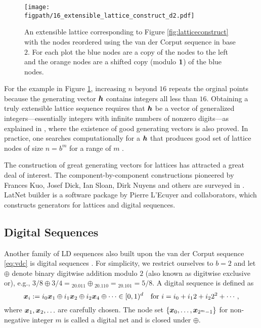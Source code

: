 \documentclass{svproc}
\newcommand{\figpath}{Figures}
\begin{document}
\begin{figure}
	\centering
	\texttt{[image: \\figpath/16\_extensible\_lattice\_construct\_d2.pdf]}
	\caption{An extensible lattice corresponding to  Figure \ref{fig:latticeconstruct}  with the nodes reordered using the van der Corput sequence in base $2$.  For each plot the blue nodes are a copy of the nodes to the left and the orange nodes are a shifted copy (modulo ${\boldsymbol{1}}$) of the blue nodes. \label{fig:extensiblelatticeconstruct}}
\end{figure}

For the example in Figure \ref{fig:extensiblelatticeconstruct}, increasing $n$ beyond $16$ repeats the orginal points because the generating vector ${\boldsymbol{h}}$ contains integers all less than $16$.  Obtaining a truly extensible lattice sequence requires that ${\boldsymbol{h}}$ be a vector of generalized integers---essentially integers with infinite numbers of nonzero digits---as explained in \cite{HicNie03a}, where the existence of good generating vectors is also proved.  In practice, one searches computationally for a ${\boldsymbol{h}}$ that produces good set of lattice nodes of size $n = b^m$ for a range of $m$ \cite{HicEtal00}.

The construction of great generating vectors for lattices has attracted a great deal of interest.  The component-by-component constructions pioneered by Frances Kuo, Josef Dick, Ian Sloan, Dirk Nuyens and others are surveyed in \cite[Chapter ?]{DicEtal22a}.  LatNet builder \cite{LEcEtal22a,LatNet} is a software package by Pierre L'Ecuyer and collaborators, which constructs generators for lattices and digital sequences.

\subsection{Digital Sequences} \label{sec:digital}

Another family of LD sequences also built upon the van der Corput sequence \eqref{eq:vdc} is digital sequences \cite{DicPil10a,Nie92}.  For simplicity, we restrict ourselves to $b = 2$ and let $\oplus$ denote binary digitwise addition modulo $2$ (also known as digitwise exclusive or), e.g., $3/8 \oplus 3/4 = {}_20.011 \oplus {}_20.110 = {}_20.101 = 5/8$.  A digital sequence is defined as
\begin{equation} \label{eq:digital}
	{\boldsymbol{x}}_i := i_0 {\boldsymbol{x}}_1 \oplus i_1 {\boldsymbol{x}}_2 \oplus i_2 {\boldsymbol{x}}_4 \oplus \cdots \in [0,1)^d \quad \text{for }
	i = i_0 + i_12 + i_2 2^2 + \cdots,
\end{equation}
where ${\boldsymbol{x}}_1, {\boldsymbol{x}}_2, \ldots$ are carefully chosen.  The node set $\{ {\boldsymbol{x}}_0, \ldots, {\boldsymbol{x}}_{2^m-1}\}$  for non-negative integer $m$ is called a digital net and is closed under $\oplus$.
\end{document}
